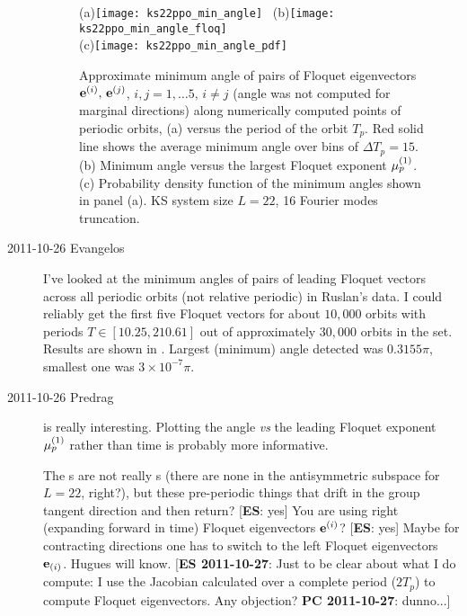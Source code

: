 \begin{description}
\begin{figure}
 (a)\texttt{[image: ks22ppo\_min\_angle]}
 ~(b)\texttt{[image: ks22ppo\_min\_angle\_floq]}\\
 (c)\texttt{[image: ks22ppo\_min\_angle\_pdf]}
\caption{
Approximate minimum angle of pairs of Floquet eigenvectors
$\jEigvec[i],\, \jEigvec[j]$, $i,j=1,\ldots 5,\, i\neq j$ (angle was not
computed for marginal directions) along numerically computed points of
periodic orbits, (a) versus the period of the orbit $T_p$. Red solid line
shows the average minimum angle over bins of $\Delta T_p=15$. (b)
Minimum angle versus the largest Floquet exponent $\eigRe[1]_p$.
(c) Probability density function of the minimum angles shown in panel
(a). KS system size $L=22$, 16 Fourier modes truncation.
}
\label{fig:ks22ppo_min_angle}
\end{figure}


\item[2011-10-26 Evangelos]
I've looked at the minimum angles of pairs of leading Floquet vectors
across all periodic orbits (not relative periodic) in Ruslan's data. I
could reliably get the first five Floquet vectors for about $10,000$
orbits with periods $T\in[10.25, 210.61]$ out of approximately $30,000$
orbits in the set. Results are shown in .
Largest (minimum) angle detected was $0.3155\pi$, smallest one was
$3\times10^{-7}\pi$.

\item[2011-10-26 Predrag]  is really
interesting. Plotting the angle {\em vs} the leading Floquet exponent $\eigRe[1]_p$
rather than time  is probably more informative.


The \po s are not really \po s (there are none in the
antisymmetric subspace for $L=22$, right?), but these pre-periodic
things that drift in the group tangent direction and then return? [{\bf ES}: yes]
You are using right (expanding forward in time) Floquet eigenvectors
$\jEigvec[i]$? [{\bf ES}: yes] Maybe for contracting directions one has to switch to the
left Floquet eigenvectors $\jEigvecT[i]$. Hugues will know.
[{\bf ES 2011-10-27}: Just to be clear about what I do compute: I use the Jacobian
calculated over a complete period ($2T_p$) to compute Floquet eigenvectors.
Any objection? {\bf PC 2011-10-27}: dunno...]


\end{description}
